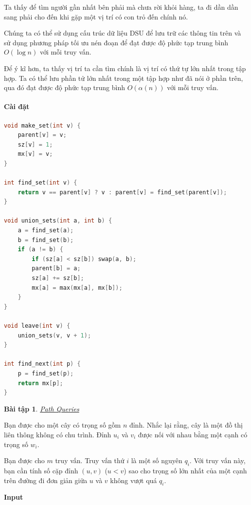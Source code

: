 \documentclass{article}
\newtheorem{baitap}{Bài tập}
\begin{document}
Ta thấy để tìm người gần nhất bên phải mà chưa rời khỏi hàng, ta đi dần dần sang phải cho đến khi gặp một vị trí có con trỏ đến chính nó.

Chúng ta có thể sử dụng cấu trúc dữ liệu DSU để lưu trữ các thông tin trên và sử dụng phương pháp tối ưu nén đoạn để đạt được độ phức tạp trung bình \(O(\log n)\) với mỗi truy vấn.

Để ý kĩ hơn, ta thấy vị trí ta cần tìm chính là vị trí có thứ tự lớn nhất trong tập hợp. Ta có thể lưu phần tử lớn nhất trong một tập hợp như đã nói ở phần trên, qua đó đạt được độ phức tạp trung bình \(O(\alpha(n))\) với mỗi truy vấn.

\paragraph{Cài đặt}
\begin{lstlisting}[language=C++]
void make_set(int v) {
    parent[v] = v;
    sz[v] = 1;
    mx[v] = v;
}

int find_set(int v) {
    return v == parent[v] ? v : parent[v] = find_set(parent[v]);
}

void union_sets(int a, int b) {
    a = find_set(a);
    b = find_set(b);
    if (a != b) {
        if (sz[a] < sz[b]) swap(a, b);
        parent[b] = a;
        sz[a] += sz[b];
        mx[a] = max(mx[a], mx[b]);
    }
}

void leave(int v) { 
    union_sets(v, v + 1);
}

int find_next(int p) { 
    p = find_set(p);
    return mx[p];
}
\end{lstlisting}

\begin{baitap}
    \href{https://codeforces.com/contest/1213/problem/G}{Path Queries}
\end{baitap}

Bạn được cho một cây có trọng số gồm $n$ đỉnh. Nhắc lại rằng, cây là một đồ thị liên thông không có chu trình. Đỉnh $u_i$ và $v_i$ được nối với nhau bằng một cạnh có trọng số $w_i$.

Bạn được cho $m$ truy vấn. Truy vấn thứ $i$ là một số nguyên $q_i$. Với truy vấn này, bạn cần tính số cặp đỉnh $(u,v)$ ($u < v$) sao cho trọng số lớn nhất của một cạnh trên đường đi đơn giản giữa $u$ và $v$ không vượt quá $q_i$.

\textbf{Input}
\end{document}
